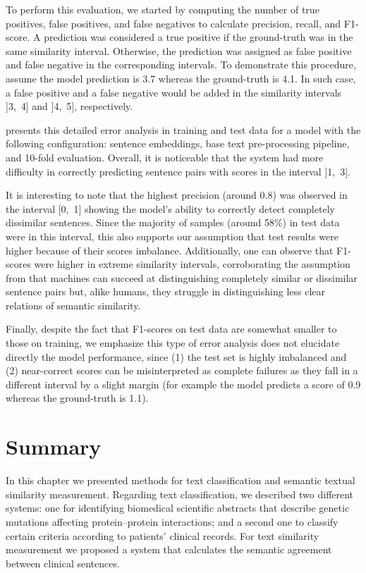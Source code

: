 To perform this evaluation, we started by computing the number of true positives, false positives, and false negatives to calculate precision, recall, and F1-score.
A prediction was considered a true positive if the ground-truth was in the same similarity interval.
Otherwise, the prediction was assigned as false positive and false negative in the corresponding intervals.
To demonstrate this procedure, assume the model prediction is 3.7 whereas the ground-truth is 4.1.
In such case, a false positive and a false negative would be added in the similarity intervals ]3,~4] and ]4,~5], respectively.

 presents this detailed error analysis in training and test data for a model with the following configuration: sentence embeddings, base text pre-processing pipeline, and 10-fold evaluation.
Overall, it is noticeable that the system had more difficulty in correctly predicting sentence pairs with scores in the interval ]1,~3].

It is interesting to note that the highest precision (around 0.8) was observed in the interval [0,~1] showing the model's ability to correctly detect completely dissimilar sentences.
Since the majority of samples (around 58\%) in test data were in this interval, this also supports our assumption that test results were higher because of their scores imbalance.
Additionally, one can observe that F1-scores were higher in extreme similarity intervals, corroborating the assumption from \textcite{wang2018e} that machines can succeed at distinguishing completely similar or dissimilar sentence pairs but, alike humans, they struggle in distinguishing less clear relations of semantic similarity.

Finally, despite the fact that F1-scores on test data are somewhat smaller to those on training, we emphasize this type of error analysis does not elucidate directly the model performance, since (1) the test set is highly imbalanced and (2) near-correct scores can be misinterpreted as complete failures as they fall in a different interval by a slight margin (for example the model predicts a score of 0.9 whereas the ground-truth is 1.1).


\section{Summary}

In this chapter we presented methods for text classification and semantic textual similarity measurement.
Regarding text classification, we described two different systems: one for identifying biomedical scientific abstracts that describe genetic mutations affecting protein--protein interactions; and a second one to classify certain criteria according to patients' clinical records.
For text similarity measurement we proposed a system that calculates the semantic agreement between clinical sentences.

